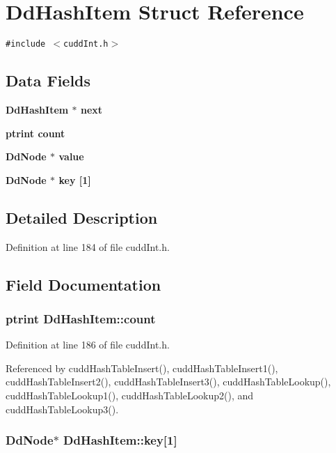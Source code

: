 \section{Dd\-Hash\-Item Struct Reference}
\label{structDdHashItem}
{\tt \#include $<$cudd\-Int.h$>$}

\subsection*{Data Fields}
\begin{CompactItemize}
\item 
\bf{Dd\-Hash\-Item} $\ast$ \bf{next}
\item 
\bf{ptrint} \bf{count}
\item 
\bf{Dd\-Node} $\ast$ \bf{value}
\item 
\bf{Dd\-Node} $\ast$ \bf{key} [1]
\end{CompactItemize}


\subsection{Detailed Description}




Definition at line 184 of file cudd\-Int.h.

\subsection{Field Documentation}
\subsubsection{\setlength{\rightskip}{0pt plus 5cm}\bf{ptrint} \bf{Dd\-Hash\-Item::count}}\label{structDdHashItem_a5bce9f94fb976df2a1768f0f0c7d50c}




Definition at line 186 of file cudd\-Int.h.

Referenced by cudd\-Hash\-Table\-Insert(), cudd\-Hash\-Table\-Insert1(), cudd\-Hash\-Table\-Insert2(), cudd\-Hash\-Table\-Insert3(), cudd\-Hash\-Table\-Lookup(), cudd\-Hash\-Table\-Lookup1(), cudd\-Hash\-Table\-Lookup2(), and cudd\-Hash\-Table\-Lookup3().
\subsubsection{\setlength{\rightskip}{0pt plus 5cm}\bf{Dd\-Node}$\ast$ \bf{Dd\-Hash\-Item::key}[1]}\label{structDdHashItem_d990341ab3d1f1e24d12f4e180984c32}




